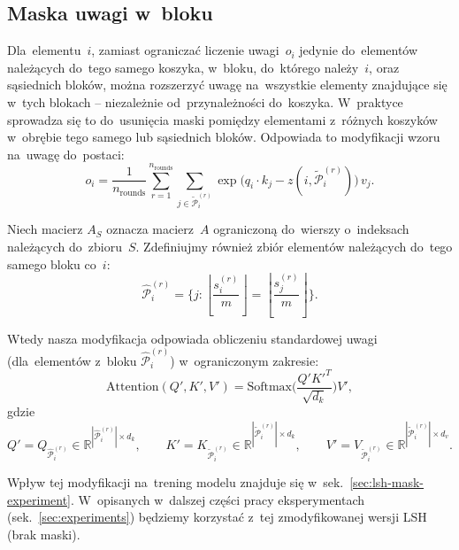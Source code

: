 \documentclass[a4paper,11pt,twoside]{report}
\theoremstyle{definition}
\begin{document}
\subsection{Maska uwagi w~bloku}\label{sec:lsh-mask-desc}

Dla~elementu~$i$, zamiast ograniczać liczenie uwagi~$o_i$ jedynie do~elementów należących do~tego samego koszyka, w~bloku, do~którego należy~$i$, oraz sąsiednich bloków, można rozszerzyć uwagę na~wszystkie elementy znajdujące się w~tych blokach -- niezależnie od~przynależności do~koszyka.  
W~praktyce sprowadza się to do~usunięcia maski pomiędzy elementami z~różnych koszyków w~obrębie tego samego lub sąsiednich bloków.  
Odpowiada to modyfikacji wzoru na~uwagę do~postaci:
\begin{equation}
o_i = 
\frac{1}{n_\text{rounds}}
\sum_{r=1}^{n_\text{rounds}}
\sum_{j \in \tilde{\mathcal{P}}_i^{(r)}} 
\exp\Big(q_i \cdot k_j - z(i, \tilde{\mathcal{P}}_i^{(r)})\Big) \, v_j
.
\end{equation}


Niech macierz $A_S$ oznacza macierz~$A$ ograniczoną do~wierszy o~indeksach należących do~zbioru~$S$.  
Zdefiniujmy również zbiór elementów należących do~tego samego bloku co~$i$:
\begin{equation}
\hat{\mathcal{P}}_i^{(r)} =
\Big\{
j :
\left\lfloor \frac{s_i^{(r)}}{m} \right\rfloor =
\left\lfloor \frac{s_j^{(r)}}{m} \right\rfloor
\Big\}
.
\end{equation}

Wtedy nasza modyfikacja odpowiada obliczeniu standardowej uwagi (dla~elementów z~bloku $\hat{\mathcal{P}}_i^{(r)}$) w~ograniczonym zakresie:
\begin{equation}
\text{Attention}(Q', K', V') =
\text{Softmax}\!\Big( \frac{Q' {K'}^{\!T}}{\sqrt{d_k}} \Big) V'
,
\end{equation}
gdzie
\begin{equation}
Q' = Q_{\hat{\mathcal{P}}_i^{(r)}} \in \mathbb{R}^{|\hat{\mathcal{P}}_i^{(r)}| \times d_k},
\qquad
K' = K_{\tilde{\mathcal{P}}_i^{(r)}} \in \mathbb{R}^{|\tilde{\mathcal{P}}_i^{(r)}| \times d_k},
\qquad
V' = V_{\tilde{\mathcal{P}}_i^{(r)}} \in \mathbb{R}^{|\tilde{\mathcal{P}}_i^{(r)}| \times d_v}
.
\end{equation}

Wpływ tej modyfikacji na~trening modelu znajduje się w~sek.~\ref{sec:lsh-mask-experiment}. W~opisanych w~dalszej części pracy eksperymentach (sek.~\ref{sec:experiments}) będziemy korzystać z~tej zmodyfikowanej wersji LSH (brak maski).
\end{document}
